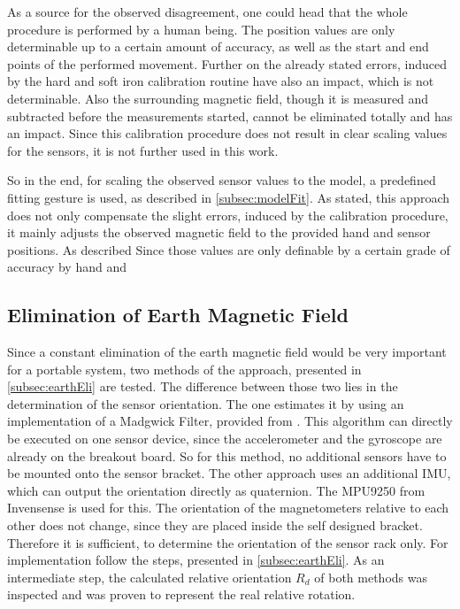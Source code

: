 As a source for the observed disagreement, one could head that the whole procedure is performed by a human being. The position values are only determinable up to a certain amount of accuracy, as well as the start and end points of the performed movement. Further on the already stated errors, induced by the hard and soft iron calibration routine have also an impact, which is not determinable. Also the surrounding magnetic field, though it is measured and subtracted before the measurements started, cannot be eliminated totally and has an impact. Since this calibration procedure does not result in clear scaling values for the sensors, it is not further used in this work. 

So in the end, for scaling the observed sensor values to the model, a predefined fitting gesture is used, as described in \ref{subsec:modelFit}. As stated, this approach does not only compensate the slight errors, induced by the calibration procedure, it mainly adjusts the observed magnetic field to the provided hand and sensor positions. As described Since those values are only definable by a certain grade of accuracy by hand and  


\subsection{Elimination of Earth Magnetic Field} \label{subsec:resEarthEli}

Since a constant elimination of the earth magnetic field would be very important for a portable system, two methods of the approach, presented in \ref{subsec:earthEli} are tested. The difference between those two lies in the determination of the sensor orientation. The one estimates it by using an implementation of a Madgwick Filter, provided from \cite{mikeshub2012}. This algorithm can directly be executed on one sensor device, since the accelerometer and the gyroscope are already on the breakout board. So for this method, no additional sensors have to be mounted onto the sensor bracket. The other approach uses an additional \ac{IMU}, which can output the orientation directly as quaternion. The MPU9250 from Invensense \cite{MPU2014} is used for this. The orientation of the magnetometers relative to each other does not change, since they are placed inside the self designed bracket. Therefore it is sufficient, to determine the orientation of the sensor rack only. For implementation follow the steps, presented in \ref{subsec:earthEli}. As an intermediate step, the calculated relative orientation $ R_{d} $ of both methods was inspected and was proven to represent the real relative rotation.

